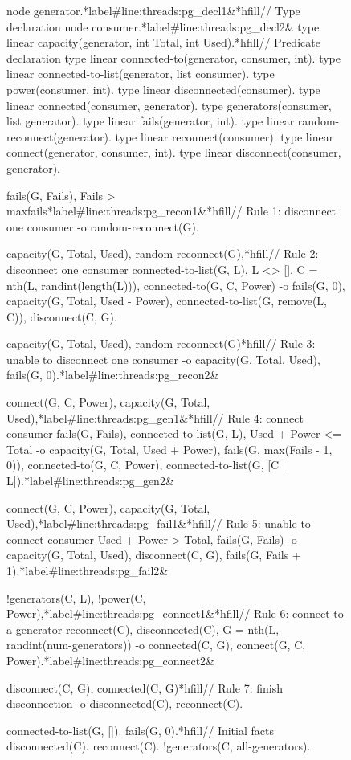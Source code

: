 \begin{figure}[h!]
\begin{LineCode}[commandchars=*\#\&]
node generator.*label#line:threads:pg_decl1&*hfill// Type declaration
node consumer.*label#line:threads:pg_decl2&
type linear capacity(generator, int Total, int Used).*hfill// Predicate declaration
type linear connected-to(generator, consumer, int).
type linear connected-to-list(generator, list consumer).
type power(consumer, int).
type linear disconnected(consumer).
type linear connected(consumer, generator).
type generators(consumer, list generator).
type linear fails(generator, int).
type linear random-reconnect(generator).
type linear reconnect(consumer).
type linear connect(generator, consumer, int).
type linear disconnect(consumer, generator).

fails(G, Fails), Fails > maxfails*label#line:threads:pg_recon1&*hfill// Rule 1: disconnect one consumer
   -o random-reconnect(G).

capacity(G, Total, Used), random-reconnect(G),*hfill// Rule 2: disconnect one consumer
connected-to-list(G, L), L <> [], C = nth(L, randint(length(L))),
connected-to(G, C, Power)
   -o fails(G, 0), capacity(G, Total, Used - Power),
      connected-to-list(G, remove(L, C)), disconnect(C, G).

capacity(G, Total, Used), random-reconnect(G)*hfill// Rule 3: unable to disconnect one consumer
   -o capacity(G, Total, Used), fails(G, 0).*label#line:threads:pg_recon2&

connect(G, C, Power), capacity(G, Total, Used),*label#line:threads:pg_gen1&*hfill// Rule 4: connect consumer
fails(G, Fails), connected-to-list(G, L), Used + Power <= Total
   -o capacity(G, Total, Used + Power),
      fails(G, max(Fails - 1, 0)), connected-to(G, C, Power),
      connected-to-list(G, [C | L]).*label#line:threads:pg_gen2&

connect(G, C, Power), capacity(G, Total, Used),*label#line:threads:pg_fail1&*hfill// Rule 5: unable to connect consumer
Used + Power > Total, fails(G, Fails)
   -o capacity(G, Total, Used), disconnect(C, G),
      fails(G, Fails + 1).*label#line:threads:pg_fail2&

!generators(C, L), !power(C, Power),*label#line:threads:pg_connect1&*hfill// Rule 6: connect to a generator
reconnect(C), disconnected(C),
G = nth(L, randint(num-generators))
   -o connected(C, G), connect(G, C, Power).*label#line:threads:pg_connect2&

disconnect(C, G), connected(C, G)*hfill// Rule 7: finish disconnection
   -o disconnected(C), reconnect(C).

connected-to-list(G, []). fails(G, 0).*hfill// Initial facts
disconnected(C). reconnect(C). !generators(C, all-generators).
\end{LineCode}
\label{code:threads:powergrid}
\end{figure}

